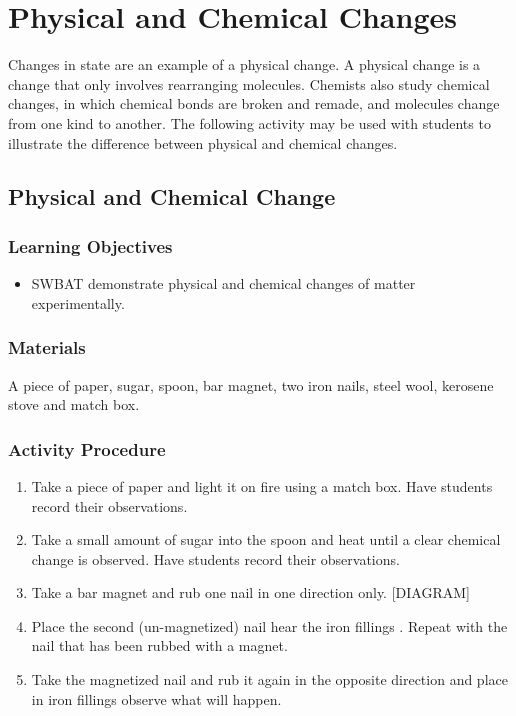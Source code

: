 \section{Physical and Chemical Changes}

Changes in state are an example of a physical change. A physical change is a change that only involves rearranging molecules. Chemists also study chemical changes, in which chemical bonds are broken and remade, and molecules change from one kind to another. The following activity may be used with students to illustrate the difference between physical and chemical changes.

\subsection{Physical and Chemical Change}

\subsubsection*{Learning Objectives}
\begin{itemize}
\item{SWBAT demonstrate physical and chemical changes of matter experimentally.}
\end{itemize}


\subsubsection*{Materials}
A piece of paper, sugar, spoon, bar magnet, two iron nails, steel wool, kerosene stove and match box.

\subsubsection*{Activity Procedure}
\begin{enumerate}
\item{Take a piece of paper and light it on fire using a match box. Have students record their observations.}
\item{Take a small amount of sugar into the spoon and heat until a clear chemical change is observed. Have students record their observations.}
\item{Take a bar magnet and rub one nail in one direction only. [DIAGRAM]}
\item{ Place the second (un-magnetized) nail hear the iron fillings . Repeat with the nail that has been rubbed with a magnet.}
\item{Take the magnetized nail and rub it again in the opposite direction and place in iron fillings observe what will happen.}
\end{enumerate}

